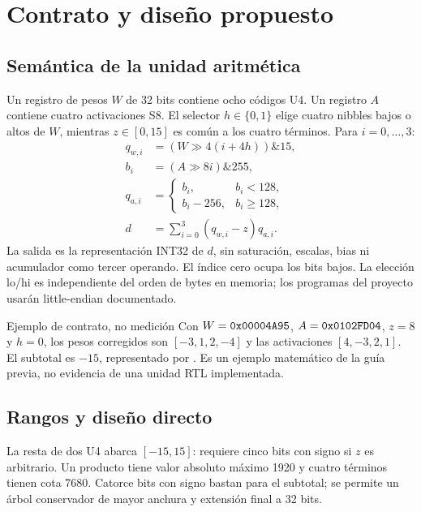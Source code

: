 \section{Contrato y diseño propuesto}
\subsection{Semántica de la unidad aritmética}
Un registro de pesos \(W\) de 32 bits contiene ocho códigos U4. Un registro
\(A\) contiene cuatro activaciones S8. El selector \(h\in\{0,1\}\) elige
cuatro nibbles bajos o altos de \(W\), mientras \(z\in[0,15]\) es común a
los cuatro términos. Para \(i=0,\ldots,3\):
\begin{align}
q_{w,i}&=(W\gg4(i+4h))\mathbin{\&}15,\\
b_i&=(A\gg8i)\mathbin{\&}255,\\
q_{a,i}&=\begin{cases}b_i,&b_i<128,\\b_i-256,&b_i\ge128,\end{cases}\\
d&=\sum_{i=0}^{3}(q_{w,i}-z)q_{a,i}.
\end{align}
La salida es la representación INT32 de \(d\), sin saturación, escalas, bias
ni acumulador como tercer operando. El índice cero ocupa los bits bajos.
La elección lo/hi es independiente del orden de bytes en memoria; los programas
del proyecto usarán little-endian documentado.

\begin{evidencebox}{Ejemplo de contrato, no medición}
Con \(W=\texttt{0x00004A95}\), \(A=\texttt{0x0102FD04}\), \(z=8\) y \(h=0\),
los pesos corregidos son \([-3,1,2,-4]\) y las activaciones \([4,-3,2,1]\).
El subtotal es \(-15\), representado por . Es un ejemplo
matemático de la guía previa, no evidencia de una unidad RTL implementada.
\end{evidencebox}

\subsection{Rangos y diseño directo}
La resta de dos U4 abarca \([-15,15]\): requiere cinco bits con signo si
\(z\) es arbitrario. Un producto tiene valor absoluto máximo 1920 y cuatro
términos tienen cota 7680. Catorce bits con signo bastan para el subtotal;
se permite un árbol conservador de mayor anchura y extensión final a 32 bits.

